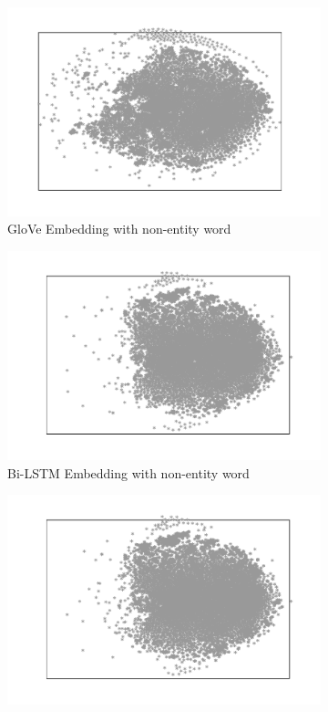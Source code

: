 \documentclass{article}
\begin{document}
\begin{figure}[t]
	\begin{subfigure}[t]{0.24\textwidth}
		\includegraphics[width=\linewidth]{glove_embedding_negative_mirror.pdf}
		\caption{GloVe Embedding with non-entity word}
		\label{fig:glove_negative}
	\end{subfigure} \hfil
   \begin{subfigure}[t]{0.24\textwidth}
	   \includegraphics[width=\linewidth]{bi_lstm_gold_negative.pdf}
	   \caption{Bi-LSTM Embedding with non-entity word}
	   \label{fig:bi_lstm_gold_negative}
   \end{subfigure} \hfil
	\begin{subfigure}[t]{0.24\textwidth}
		\includegraphics[width=\linewidth]{bi_lstm_mlp_negative.pdf}

\end{subfigure}
\end{figure}
\end{document}
